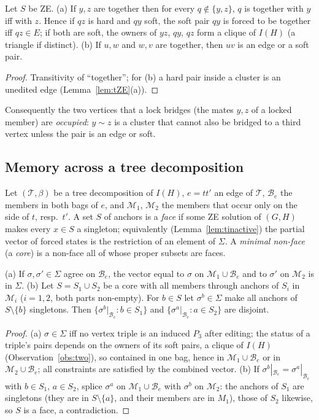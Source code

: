 \begin{lemma}\label{lem:trigid}
Let $S$ be ZE. (a) If $y,z$ are together then for every $q\notin\{y,z\}$, $q$ is together with $y$ iff with $z$. Hence if $qz$ is hard and $qy$ soft, the soft pair $qy$ is forced to be together iff $qz\in E$; if both are soft, the owners of $yz$, $qy$, $qz$ form a clique of $I(H)$ (a triangle if distinct). (b) If $u,w$ and $w,v$ are together, then $uv$ is an edge or a soft pair.
\end{lemma}
\begin{proof}
Transitivity of ``together''; for (b) a hard pair inside a cluster is an unedited edge (Lemma~\ref{lem:tZE}(a)).
\end{proof}
Consequently the two vertices that a lock bridges (the mates $y,z$ of a locked member) are \emph{occupied}: $y\sim z$ is a cluster that cannot also be bridged to a third vertex unless the pair is an edge or soft.


\subsection{Memory across a tree decomposition}
Let $(\mathcal T,\beta)$ be a tree decomposition of $I(H)$, $e=tt'$ an edge of $\mathcal T$, $\mathcal B_e$ the members in both bags of $e$, and $\mathcal M_1$, $\mathcal M_2$ the members that occur only on the side of $t$, resp.\ $t'$.
A set $S$ of anchors is a \emph{face} if some ZE solution of $(G,H)$ makes every $x\in S$ a singleton; equivalently (Lemma~\ref{lem:tinactive}) the partial vector of forced states is the restriction of an element of $\Sigma$. A \emph{minimal non-face} (a \emph{core}) is a non-face all of whose proper subsets are faces.

\begin{lemma}[Splice]\label{lem:tsplice}
(a) If $\sigma,\sigma'\in\Sigma$ agree on $\mathcal B_e$, the vector equal to $\sigma$ on $\mathcal M_1\cup\mathcal B_e$ and to $\sigma'$ on $\mathcal M_2$ is in $\Sigma$.
(b) Let $S=S_1\cup S_2$ be a core with all members through anchors of $S_i$ in $\mathcal M_i$ ($i=1,2$, both parts non-empty). For $b\in S$ let $\sigma^b\in\Sigma$ make all anchors of $S\setminus\{b\}$ singletons. Then $\{\sigma^b|_{\mathcal B_e}:b\in S_1\}$ and $\{\sigma^a|_{\mathcal B_e}:a\in S_2\}$ are disjoint.
\end{lemma}
\begin{proof}
(a) $\sigma\in\Sigma$ iff no vertex triple is an induced $P_3$ after editing; the status of a triple's pairs depends on the owners of its soft pairs, a clique of $I(H)$ (Observation~\ref{obs:two}), so contained in one bag, hence in $\mathcal M_1\cup\mathcal B_e$ or in $\mathcal M_2\cup\mathcal B_e$; all constraints are satisfied by the combined vector. (b) If $\sigma^b|_{\mathcal B_e}=\sigma^a|_{\mathcal B_e}$ with $b\in S_1$, $a\in S_2$, splice $\sigma^a$ on $\mathcal M_1\cup\mathcal B_e$ with $\sigma^b$ on $\mathcal M_2$: the anchors of $S_1$ are singletons (they are in $S\setminus\{a\}$, and their members are in $M_1$), those of $S_2$ likewise, so $S$ is a face, a contradiction.
\end{proof}


